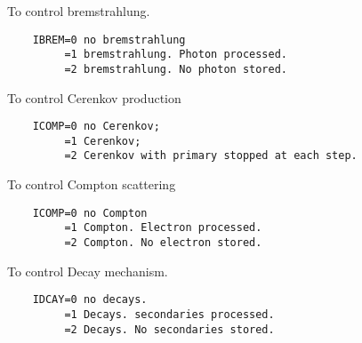 \ENDCMD


\BEGARG
{}
\ENDARG
{}
\ENDOPT

   \par
To control bremstrahlung.  
\begin{verbatim}
    IBREM=0 no bremstrahlung
         =1 bremstrahlung. Photon processed.
         =2 bremstrahlung. No photon stored.
\end{verbatim}

\ENDCMD


\BEGARG
{}
\ENDARG
{}
\ENDOPT

   \par
To control Cerenkov production 
\begin{verbatim}
    ICOMP=0 no Cerenkov;
         =1 Cerenkov;
         =2 Cerenkov with primary stopped at each step.
\end{verbatim}

\ENDCMD


\BEGARG
{}
\ENDARG
{}
\ENDOPT

   \par
To control Compton scattering 
\begin{verbatim}
    ICOMP=0 no Compton
         =1 Compton. Electron processed.
         =2 Compton. No electron stored.
\end{verbatim}

\ENDCMD


\BEGARG
{}
\ENDARG
{}
\ENDOPT

   \par
To control Decay mechanism.  
\begin{verbatim}
    IDCAY=0 no decays.
         =1 Decays. secondaries processed.
         =2 Decays. No secondaries stored.
\end{verbatim}

\ENDCMD

